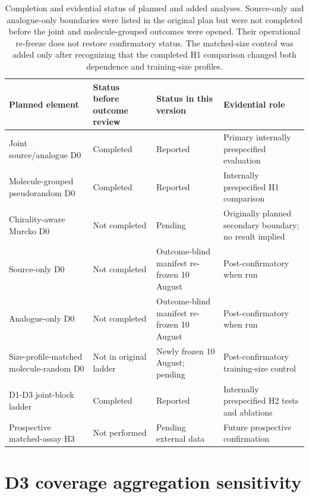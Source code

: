\documentclass[10pt]{article}
\begin{document}
\begin{table}[htbp]
\centering
\caption{Completion and evidential status of planned and added analyses. Source-only and analogue-only boundaries were listed in the original plan but were not completed before the joint and molecule-grouped outcomes were opened. Their operational re-freeze does not restore confirmatory status. The matched-size control was added only after recognizing that the completed H1 comparison changed both dependence and training-size profiles.}
\scriptsize
\setlength{\tabcolsep}{3pt}
\renewcommand{\arraystretch}{1.15}
\begin{tabularx}{\textwidth}{>{\raggedright\arraybackslash}p{}>{\raggedright\arraybackslash}p{}>{\raggedright\arraybackslash}p{}>{\raggedright\arraybackslash}X}
\toprule
\textbf{Planned element} & \textbf{Status before outcome review} & \textbf{Status in this version} & \textbf{Evidential role} \\
\midrule
Joint source/analogue D0 & Completed & Reported & Primary internally prespecified evaluation \\
Molecule-grouped pseudorandom D0 & Completed & Reported & Internally prespecified H1 comparison \\
Chirality-aware Murcko D0 & Not completed & Pending & Originally planned secondary boundary; no result implied \\
Source-only D0 & Not completed & Outcome-blind manifest re-frozen 10 August & Post-confirmatory when run \\
Analogue-only D0 & Not completed & Outcome-blind manifest re-frozen 10 August & Post-confirmatory when run \\
Size-profile-matched molecule-random D0 & Not in original ladder & Newly frozen 10 August; pending & Post-confirmatory training-size control \\
D1-D3 joint-block ladder & Completed & Reported & Internally prespecified H2 tests and ablations \\
Prospective matched-assay H3 & Not performed & Pending external data & Future prospective confirmation \\
\bottomrule
\end{tabularx}
\end{table}

\section*{D3 coverage aggregation sensitivity}
\end{document}
